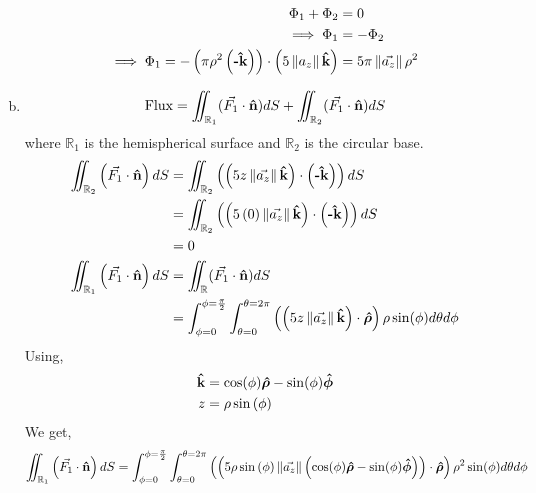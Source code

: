\begin{problem}{}{}
\begin{enumerate}[(a)]
\begin{align*}
                \Phi_1 + \Phi_2 &= 0\\
                \implies \Phi_1 &= -\Phi_2\\
                \implies \Phi_1 = -\left(\pi\rho^2\left(\boldsymbol{\hat{\textbf{-k}}}\right)\right)\cdot\left(5\left\Vert a_z\right\Vert\boldsymbol{\hat{\textbf{k}}}\right) &= 5\pi\left\Vert\vec{a_z}\right\Vert\rho^2
            \end{align*}
        \item 
            \begin{align*}
                \text{Flux} &= \iint_{\mathbb{R}_1} (\vec{F_1}\cdot\boldsymbol{\hat{\textbf{n}}}) dS + \iint_{\mathbb{R}_2} (\vec{F_1}\cdot\boldsymbol{\hat{\textbf{n}}}) dS\\
            \end{align*}
            where $\mathbb{R}_1$ is the hemispherical surface and $\mathbb{R}_2$ is the circular base.
            \begin{align*}
              \iint_{\mathbb{R}_2} \left(\vec{F_1}\cdot\boldsymbol{\hat{\textbf{n}}}\right) dS &= \iint_{\mathbb{R}_2} \left(\left(5z\left\Vert \vec{a_z} \right\Vert\boldsymbol{\hat{\textbf{k}}}\right)\cdot\left(\boldsymbol{\hat{\textbf{-k}}}\right)\right) dS\\
              &= \iint_{\mathbb{R}_2} \left(\left(5\left(0\right)\left\Vert \vec{a_z} \right\Vert\boldsymbol{\hat{\textbf{k}}}\right)\cdot\left(\boldsymbol{\hat{\textbf{-k}}}\right)\right) dS\\
              &= 0\\
              \iint_{\mathbb{R}_1} \left(\vec{F_1}\cdot\boldsymbol{\hat{\textbf{n}}}\right) dS &= \iint_{\mathbb{R}} (\vec{F_1}\cdot\boldsymbol{\hat{\textbf{n}}}) dS\\
                &=\int_{\phi=0}^{\phi=\frac{\pi}{2}}\int_{\theta = 0}^{\theta =2\pi} \left(\left(5z\left\Vert\vec{a_z}\right\Vert\boldsymbol{\hat{\textbf{k}}}\right)\cdot{\boldsymbol{\hat{\rho}}}\right)\rho \sin(\phi)d\theta d\phi
            \end{align*}
            Using, 
            \begin{align*}
                \boldsymbol{\hat{\textbf{k}}} &= \cos(\phi)\boldsymbol{\hat{\rho}} - \sin(\phi)\boldsymbol{\hat{\phi}}\\
                z &= \rho \sin\left(\phi\right) 
            \end{align*}
            We get,
            \begin{align*}
                \iint_{\mathbb{R}_1} \left(\vec{F_1}\cdot\uvec{n}\right) dS&=\int_{\phi=0}^{\phi=\frac{\pi}{2}}\int_{\theta = 0}^{\theta =2\pi} \left(\left(5\rho\sin\left(\phi\right)\left\Vert\vec{a_z}\right\Vert\left(\cos(\phi)\boldsymbol{\hat{\rho}} - \sin(\phi)\boldsymbol{\hat{\phi}}\right)\right)\cdot{\boldsymbol{\hat{\rho}}}\right)\rho^2 \sin(\phi)d\theta d\phi\\

\end{align*}
\end{enumerate}
\end{problem}
